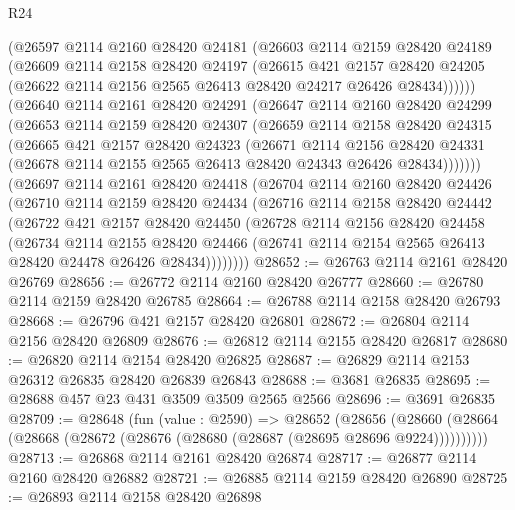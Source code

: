 \begin{lexlean}{R24}
\begin{coremodule}
      (@26597
        @2114
        @2160
        @28420
        @24181
        (@26603
          @2114
          @2159
          @28420
          @24189
          (@26609
            @2114
            @2158
            @28420
            @24197
            (@26615
              @421
              @2157
              @28420
              @24205
              (@26622 @2114 @2156 @2565 @26413 @28420 @24217 @26426 @28434))))))
    (@26640
      @2114
      @2161
      @28420
      @24291
      (@26647
        @2114
        @2160
        @28420
        @24299
        (@26653
          @2114
          @2159
          @28420
          @24307
          (@26659
            @2114
            @2158
            @28420
            @24315
            (@26665
              @421
              @2157
              @28420
              @24323
              (@26671
                @2114
                @2156
                @28420
                @24331
                (@26678 @2114 @2155 @2565 @26413 @28420 @24343 @26426 @28434)))))))
    (@26697
      @2114
      @2161
      @28420
      @24418
      (@26704
        @2114
        @2160
        @28420
        @24426
        (@26710
          @2114
          @2159
          @28420
          @24434
          (@26716
            @2114
            @2158
            @28420
            @24442
            (@26722
              @421
              @2157
              @28420
              @24450
              (@26728
                @2114
                @2156
                @28420
                @24458
                (@26734
                  @2114
                  @2155
                  @28420
                  @24466
                  (@26741 @2114 @2154 @2565 @26413 @28420 @24478 @26426 @28434))))))))
@28652 := @26763 @2114 @2161 @28420 @26769
@28656 := @26772 @2114 @2160 @28420 @26777
@28660 := @26780 @2114 @2159 @28420 @26785
@28664 := @26788 @2114 @2158 @28420 @26793
@28668 := @26796 @421 @2157 @28420 @26801
@28672 := @26804 @2114 @2156 @28420 @26809
@28676 := @26812 @2114 @2155 @28420 @26817
@28680 := @26820 @2114 @2154 @28420 @26825
@28687 := @26829 @2114 @2153 @26312 @26835 @28420 @26839 @26843
@28688 := @3681 @26835
@28695 := @28688 @457 @23 @431 @3509 @3509 @2565 @2566
@28696 := @3691 @26835
@28709 := @28648
    (fun (value : @2590) =>
    @28652
      (@28656 (@28660 (@28664 (@28668 (@28672 (@28676 (@28680 (@28687 (@28695 @28696 @9224))))))))))
@28713 := @26868 @2114 @2161 @28420 @26874
@28717 := @26877 @2114 @2160 @28420 @26882
@28721 := @26885 @2114 @2159 @28420 @26890
@28725 := @26893 @2114 @2158 @28420 @26898

\end{coremodule}
\end{lexlean}
